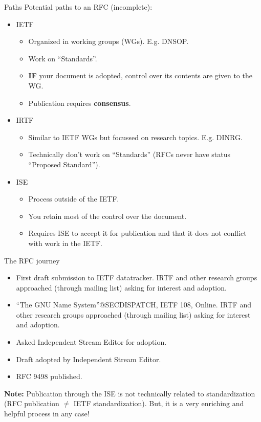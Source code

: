 \documentclass[aspectratio=169]{beamer}
\let\oldemph\textbf
\renewcommand{\textbf}[1]{{\color{mLightBrown}\oldemph{#1}}}
\begin{document}
\begin{frame}{Paths}
  Potential paths to an RFC (incomplete):
  \begin{itemize}
  \item IETF
    \begin{itemize}
    \item Organized in working groups (WGs). E.g. DNSOP.
    \item Work on ``Standards''.
    \item \textbf{IF} your document is adopted, control over its contents are given to the WG.
    \item Publication requires \textbf{consensus}.
    \end{itemize}
  \item IRTF
    \begin{itemize}
    \item Similar to IETF WGs but focussed on research topics. E.g. DINRG.
    \item Technically don't work on ``Standards'' (RFCs never have status ``Proposed Standard'').
    \end{itemize}
  \item ISE
    \begin{itemize}
    \item Process outside of the IETF.
    \item You retain most of the control over the document.
    \item Requires ISE to accept it for publication and that it does not conflict with work in the IETF.
    \end{itemize}
  \end{itemize}
\end{frame}

\begin{frame}{The RFC journey}
  \begin{itemize}
  \item[2020/5:] First draft submission to IETF datatracker. IRTF and other research groups approached (through mailing list) asking for interest and adoption.
  \item[2020/7:] ``The GNU Name System''@SECDISPATCH, IETF 108, Online. IRTF and other research groups approached (through mailing list) asking for interest and adoption.
  \item[2021/5:] Asked Independent Stream Editor for adoption.
  \item[2021/11:] Draft adopted by Independent Stream Editor.
  \item[2023/11:] RFC 9498 published.
  \end{itemize}
  \textbf{Note:} Publication through the ISE is not technically related to standardization (RFC publication $\neq$ IETF standardization). But, it is a very enriching and helpful process in any case!
\end{frame}
\end{document}
